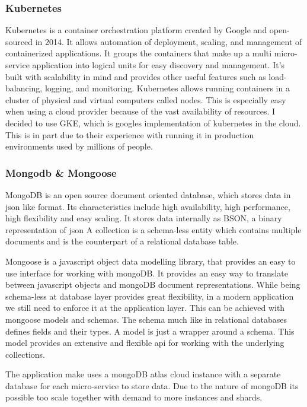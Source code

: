 \subsubsection{Kubernetes}
Kubernetes is a container orchestration platform created by Google and open-sourced in 2014. It allows automation of deployment, scaling, and management of containerized applications. It groups the containers that make up a multi micro-service application into logical units for easy discovery and management. It's built with scalability in mind and provides other useful features such as load-balancing, logging, and monitoring. Kubernetes allows running containers in a cluster of physical and virtual computers called nodes. This is especially easy when using a cloud provider because of the vast availability of resources. 
I decided to use GKE, which is googles implementation of kubernetes in the cloud. This is in part due to their experience with running it in production environments used by millions of people. 

\subsubsection{Mongodb \& Mongoose}
MongoDB is an open source document oriented database, which stores data in json like format. Its characteristics include high availability, high performance, high flexibility and easy scaling. It stores data internally as BSON, a binary representation of json A collection is a schema-less entity which contains multiple documents and is the counterpart of a relational database table.

Mongoose is a javascript object data modelling library, that provides an easy to use interface for working with mongoDB. It provides an easy way to translate between javascript objects and mongoDB document representations. While being schema-less at database layer provides great flexibility, in a modern application we still need to enforce it at the application layer. This can be achieved with mongoose models and schemas. The schema much like in relational databases defines fields and their types. A model is just a wrapper around a schema. This model provides an extensive and flexible api for working with the underlying collections.

The application make uses a mongoDB atlas cloud instance with a separate database for each micro-service to store data. Due to the nature of mongoDB its possible too scale together with demand to more instances and shards.


